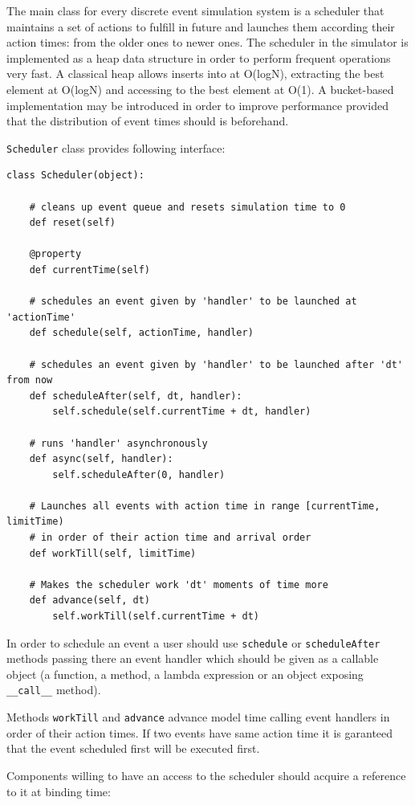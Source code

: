 \documentclass[a4paper,11pt]{article}
\begin{document}
The main class for every discrete event simulation system is a scheduler
that maintains a set of actions to fulfill in future and launches them
according their action times: from the older ones to newer ones. The
scheduler in the simulator is implemented as a heap data structure in
order to perform frequent operations very fast. A classical heap allows
inserts into at O(logN), extracting the best element at O(logN) and
accessing to the best element at O(1). A bucket-based implementation may
be introduced in order to improve performance provided that the
distribution of event times should is beforehand.

\texttt{Scheduler} class provides following interface:
\begin{verbatim}
class Scheduler(object):

    # cleans up event queue and resets simulation time to 0
    def reset(self)

    @property
    def currentTime(self)

    # schedules an event given by 'handler' to be launched at 'actionTime'
    def schedule(self, actionTime, handler)

    # schedules an event given by 'handler' to be launched after 'dt' from now
    def scheduleAfter(self, dt, handler):
        self.schedule(self.currentTime + dt, handler)

    # runs 'handler' asynchronously
    def async(self, handler):
        self.scheduleAfter(0, handler)

    # Launches all events with action time in range [currentTime, limitTime)
    # in order of their action time and arrival order
    def workTill(self, limitTime)

    # Makes the scheduler work 'dt' moments of time more
    def advance(self, dt)
        self.workTill(self.currentTime + dt)
\end{verbatim}

In order to schedule an event a user should use \texttt{schedule} or
\texttt{scheduleAfter} methods passing there an event handler which
should be given as a callable object (a function, a method, a lambda
expression or an object exposing \texttt{\_\_call\_\_} method).

Methods \texttt{workTill} and \texttt{advance} advance model time
calling event handlers in order of their action times. If two events
have same action time it is garanteed that the event scheduled first
will be executed first. 

Components willing to have an access to the scheduler should acquire a
reference to it at binding time:
\end{document}
